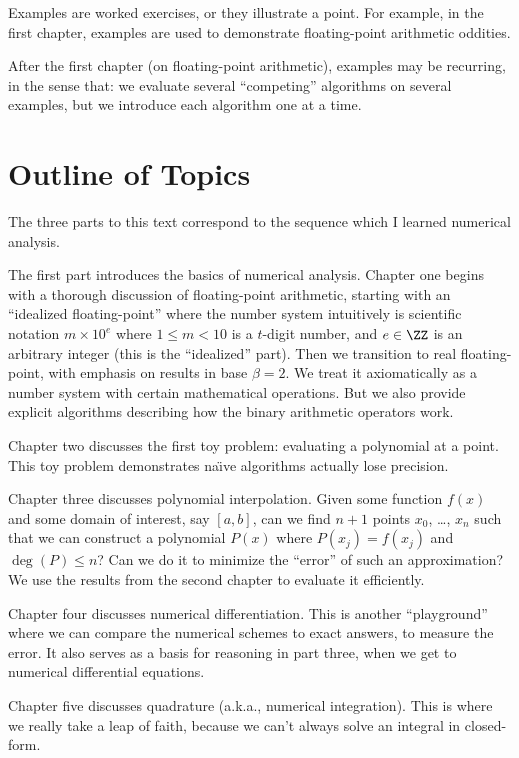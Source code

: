 Examples are worked exercises, or they illustrate a point. For example,
in the first chapter, examples are used to demonstrate floating-point
arithmetic oddities.

After the first chapter (on floating-point arithmetic), examples may be
recurring, in the sense that: we evaluate several ``competing''
algorithms on several examples, but we introduce each algorithm one at a
time. 

\section*{Outline of Topics}

The three parts to this text correspond to the sequence which I learned
numerical analysis.

The first part introduces the basics of numerical analysis. Chapter one begins
with a thorough discussion of floating-point arithmetic, starting with
an ``idealized floating-point'' where the number system intuitively
is scientific notation $m\times 10^{e}$ where $1\leq m<10$ is a
$t$-digit number, and $e\in\ZZ$ is an arbitrary integer (this is the
``idealized'' part). Then we transition to real 
floating-point, with emphasis on results in base $\beta=2$. We treat it
axiomatically as a number system with certain mathematical
operations. But we also provide explicit algorithms describing how the
binary arithmetic operators work.

Chapter two discusses the first toy problem: evaluating a polynomial at
a point. This toy problem demonstrates na\"{\i}ve algorithms actually
lose precision.

Chapter three discusses polynomial interpolation. Given some function
$f(x)$ and some domain of interest, say $[a,b]$, can we find $n+1$ points
$x_{0}$, \dots, $x_{n}$ such that we can construct a polynomial $P(x)$
where $P(x_{j})=f(x_{j})$ and $\deg(P)\leq n$? Can we do it to minimize
the ``error'' of such an approximation? We use the results from the
second chapter to evaluate it efficiently.

Chapter four discusses numerical differentiation. This is another
``playground'' where we can compare the numerical schemes to exact
answers, to measure the error. It also serves as a basis for reasoning
in part three, when we get to numerical differential equations.

Chapter five discusses quadrature (a.k.a., numerical integration).
This is where we really take a leap of faith, because we can't always
solve an integral in closed-form.

